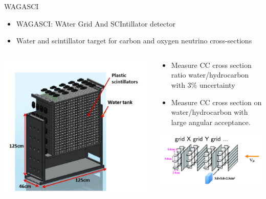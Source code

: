 \documentclass{beamer}
\begin{document}
\begin{frame}{WAGASCI}

\begin{itemize}
\item WAGASCI: WAter Grid And SCIntillator detector 
\item Water and scintillator target for carbon and oxygen neutrino cross-sections
\end{itemize}

\begin{columns}[c]
\begin{column}{.5\textwidth}
\includegraphics[width=\textwidth]{images/wagasci}
\end{column}
\begin{column}{.5\textwidth}
\begin{itemize}
\item Measure CC cross section ratio water/hydrocarbon with 3\% uncertainty
\item Measure CC cross section on water/hydrocarbon with large angular acceptance.
\end{itemize}

\includegraphics[width=\textwidth]{images/wagsche}
\end{column}
\end{columns}

\end{frame}
\end{document}
